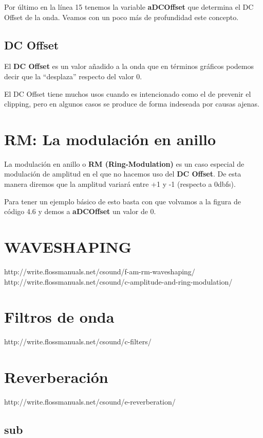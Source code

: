 Por último en la línea 15 tenemos la variable \textbf{aDCOffset} que determina el DC Offset de la onda. Veamos con un poco más de profundidad este concepto.

\subsection{DC Offset}
El \textbf{DC Offset} es un valor añadido a la onda que en términos gráficos podemos decir que la ``desplaza'' respecto del valor 0. 
 
El DC Offset tiene muchos usos cuando es intencionado como el de prevenir el clipping, pero en algunos casos se produce de forma indeseada por causas ajenas.
 
\section{RM: La modulación en anillo}

La modulación en anillo o \textbf{RM (Ring-Modulation)} es un caso especial de modulación de amplitud en el que no hacemos uso del \textbf{DC Offset}. De esta manera diremos que la amplitud variará entre +1 y -1 (respecto a 0dbfs).

Para tener un ejemplo básico de esto basta con que volvamos a la figura de código 4.6 y demos a \textbf{aDCOffset} un valor de 0.

\section{WAVESHAPING}
http://write.flossmanuals.net/csound/f-am-rm-waveshaping/
http://write.flossmanuals.net/csound/c-amplitude-and-ring-modulation/
\section{Filtros de onda}
http://write.flossmanuals.net/csound/c-filters/
\section{Reverberación}
http://write.flossmanuals.net/csound/e-reverberation/

\subsection{sub}


 

